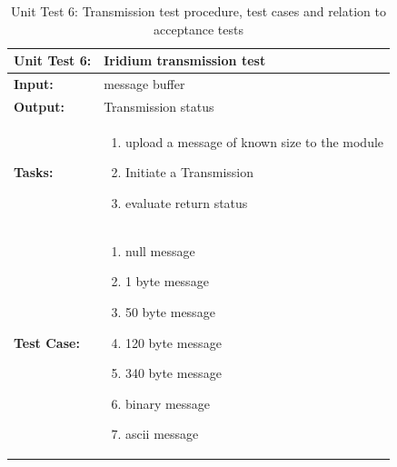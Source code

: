 \begin{table}[H]
    \centering
    \caption{Unit Test 6: Transmission test procedure, test cases and relation to acceptance tests}
    \begin{tabular}{|m{}|m{}|}
    \hline
       \textbf{Unit Test 6: }  &  Iridium transmission test\\
       \hline
        \textbf{Input: } &  message buffer\\
        \hline
        \textbf{Output: } & Transmission status\\
        \hline
        \textbf{Tasks: } & \begin{enumerate}
        \vspace{1mm}
            \item upload a message of known size to the module
            \item Initiate a Transmission
            \item evaluate return status
        \end{enumerate}\\
        \hline
        \textbf{Test Case: } & \begin{enumerate}
            \vspace{1mm}
            \item null message
            \item 1 byte message
            \item 50 byte message
            \item 120 byte message
            \item 340 byte message
            \item binary message
            \item ascii message
            
        \end{enumerate}\\
        \hline
    \end{tabular}

    \label{tab:UT006}
\end{table}


